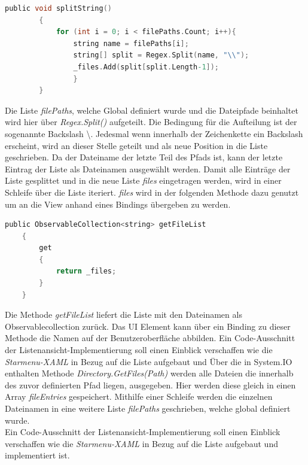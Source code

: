 \pagebreak
\begin{lstlisting}[language=C,
    frame=single,           % Ein Rahmen um den Code
    framexleftmargin=15pt,  % Rahmen link von den Zahlen
    style=algoBericht,
    label={splitString},
    captionpos=b,           % Caption unter den Code setzen
    caption={splitString}]
    public void splitString()
        {
            for (int i = 0; i < filePaths.Count; i++){
                string name = filePaths[i];
                string[] split = Regex.Split(name, "\\");
                _files.Add(split[split.Length-1]);
                }
        }
\end{lstlisting}
Die Liste \textit{filePaths}, welche Global definiert wurde und die Dateipfade beinhaltet wird hier über \textit{Regex.Split()} aufgeteilt. Die Bedingung für die Aufteilung ist der sogenannte Backslash \textbackslash. Jedesmal wenn innerhalb der Zeichenkette ein Backslash erscheint, wird an dieser Stelle geteilt und als neue Position in die Liste geschrieben. Da der Dateiname der letzte Teil des Pfads ist, kann der letzte Eintrag der Liste als Dateinamen ausgewählt werden. Damit alle Einträge der Liste gesplittet und in die neue Liste \textit{files} eingetragen werden, wird in einer Schleife über die Liste iteriert. \textit{files} wird in der folgenden Methode dazu genutzt um an die View anhand eines Bindings übergeben zu werden. 
\\
\begin{lstlisting}[language=C,
    frame=single,           % Ein Rahmen um den Code
    framexleftmargin=15pt,  % Rahmen link von den Zahlen
    style=algoBericht,
    label={getFileList},
    captionpos=b,           % Caption unter den Code setzen
    caption={getFileList}]
    public ObservableCollection<string> getFileList
    {
        get
        {
            return _files;
        }
    }
\end{lstlisting}
Die Methode \textit{getFileList} liefert die Liste mit den Dateinamen als Observablecollection zurück. Das UI Element kann über ein Binding zu dieser Methode die Namen auf der Benutzeroberfläche abbilden.  
Ein Code-Ausschnitt der Listenansicht-Implementierung soll einen Einblick verschaffen wie die \textit{Starmenu-XAML} in Bezug auf die Liste aufgebaut und 
Über die in System.IO enthalten Methode \textit{Directory.GetFiles(Path)} 
werden alle Dateien die innerhalb des zuvor definierten Pfad 
liegen, ausgegeben. Hier werden diese gleich in einen Array \textit{fileEntries} gespeichert. Mithilfe einer Schleife werden die einzelnen 
Dateinamen in eine weitere Liste \textit{filePaths} geschrieben, welche global definiert wurde.
\\
Ein Code-Ausschnitt der Listenansicht-Implementierung soll einen Einblick verschaffen wie die 
\textit{Starmenu-XAML} in Bezug auf die Liste aufgebaut und 
implementiert ist.
\\
\pagebreak
